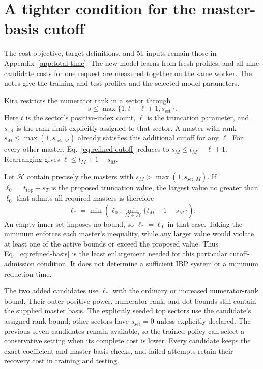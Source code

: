 \section{A tighter condition for the master-basis cutoff}
\label{app:refined-time}
The cost objective, target definitions, and 51 inputs remain those in Appendix~\ref{app:total-time}. The new model learns from fresh profiles, and all nine candidate costs for one request are measured together on the same worker. The notes give the training and test profiles and the selected model parameters.

Kira restricts the numerator rank in a sector through~\cite{Kira3}
\begin{equation}
 s\leq\max\{1,t-\ell+1,s_{\mathrm{set}}\}.
 \label{eq:refined-cutoff}
\end{equation}
Here $t$ is the sector's positive-index count, $\ell$ is the truncation parameter, and $s_{\mathrm{set}}$ is the rank limit explicitly assigned to that sector. A master with rank $s_M\leq\max(1,s_{\mathrm{set},M})$ already satisfies this additional cutoff for any $\ell$. For every other master, Eq.~\eqref{eq:refined-cutoff} reduces to $s_M\leq t_M-\ell+1$. Rearranging gives $\ell\leq t_M+1-s_M$.

Let $\mathcal H$ contain precisely the masters with $s_M>\max(1,s_{\mathrm{set},M})$. If $\ell_0=t_{\mathrm{top}}-s_T$ is the proposed truncation value, the largest value no greater than $\ell_0$ that admits all required masters is therefore
\begin{equation}
 \ell_* = \min\left(\ell_0,\min_{M\in\mathcal H}\{t_M+1-s_M\}\right).
 \label{eq:refined-basis}
\end{equation}
An empty inner set imposes no bound, so $\ell_*=\ell_0$ in that case. Taking the minimum enforces each master's inequality, while any larger value would violate at least one of the active bounds or exceed the proposed value. Thus Eq.~\eqref{eq:refined-basis} is the least enlargement needed for this particular cutoff-admission condition. It does not determine a sufficient IBP system or a minimum reduction time.

The two added candidates use $\ell_*$ with the ordinary or increased numerator-rank bound. Their outer positive-power, numerator-rank, and dot bounds still contain the supplied master basis. The explicitly seeded top sectors use the candidate's assigned rank bound; other sectors have $s_{\mathrm{set}}=0$ unless explicitly declared. The previous seven candidates remain available, so the trained policy can select a conservative setting when its complete cost is lower. Every candidate keeps the exact coefficient and master-basis checks, and failed attempts retain their recovery cost in training and testing.
